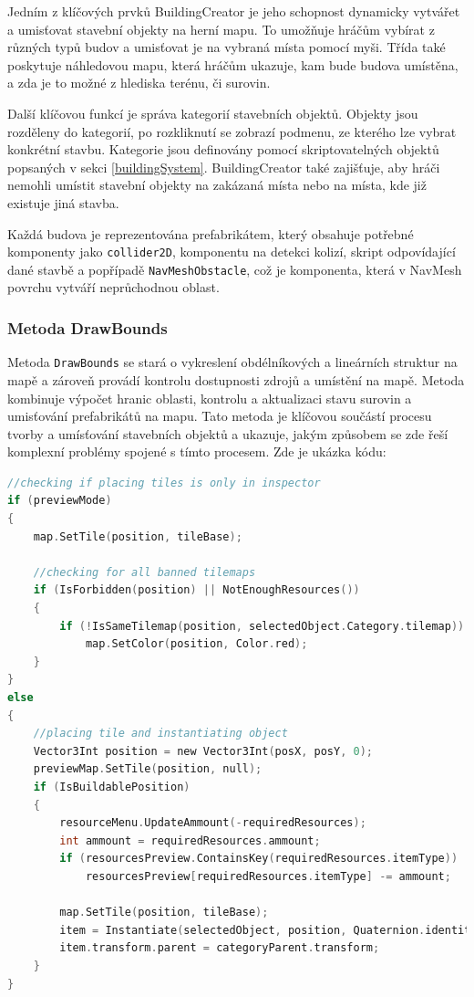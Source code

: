Jedním z klíčových prvků BuildingCreator je jeho schopnost dynamicky vytvářet a umisťovat stavební objekty na herní mapu. To umožňuje hráčům vybírat z různých typů budov a umisťovat je na vybraná místa pomocí myši. Třída také poskytuje náhledovou mapu, která hráčům ukazuje, kam bude budova umístěna, a zda je to možné z hlediska terénu, či surovin.

Další klíčovou funkcí je správa kategorií stavebních objektů. Objekty jsou rozděleny do kategorií, po rozkliknutí se zobrazí podmenu, ze kterého lze vybrat konkrétní stavbu. Kategorie jsou definovány pomocí skriptovatelných objektů popsaných v sekci \ref{buildingSystem}. BuildingCreator také zajišťuje, aby hráči nemohli umístit stavební objekty na zakázaná místa nebo na místa, kde již existuje jiná stavba. 

Každá budova je reprezentována prefabrikátem, který obsahuje potřebné komponenty jako \texttt{collider2D}, komponentu na detekci kolizí, skript odpovídající dané stavbě a popřípadě \texttt{NavMeshObstacle}, což je komponenta, která v NavMesh povrchu vytváří neprůchodnou oblast.

\subsubsection{Metoda DrawBounds}
Metoda \texttt{DrawBounds} se stará o vykreslení obdélníkových a lineárních struktur na mapě a zároveň provádí kontrolu dostupnosti zdrojů a umístění na mapě. Metoda kombinuje výpočet hranic oblasti, kontrolu a aktualizaci stavu surovin a umisťování prefabrikátů na mapu. Tato metoda je klíčovou součástí procesu tvorby a umísťování stavebních objektů a ukazuje, jakým způsobem se zde řeší komplexní problémy spojené s tímto procesem. Zde je ukázka kódu:

\begin{lstlisting}[language=C]
//checking if placing tiles is only in inspector
if (previewMode)
{
	map.SetTile(position, tileBase);
	
	//checking for all banned tilemaps
	if (IsForbidden(position) || NotEnoughResources())
	{
		if (!IsSameTilemap(position, selectedObject.Category.tilemap))
			map.SetColor(position, Color.red);
	}
}
else
{
	//placing tile and instantiating object
	Vector3Int position = new Vector3Int(posX, posY, 0);
	previewMap.SetTile(position, null);	
	if (IsBuildablePosition)
	{
		resourceMenu.UpdateAmmount(-requiredResources);
		int ammount = requiredResources.ammount;
		if (resourcesPreview.ContainsKey(requiredResources.itemType))
			resourcesPreview[requiredResources.itemType] -= ammount;
		
		map.SetTile(position, tileBase);
		item = Instantiate(selectedObject, position, Quaternion.identity);
		item.transform.parent = categoryParent.transform;
	}
}
\end{lstlisting}

